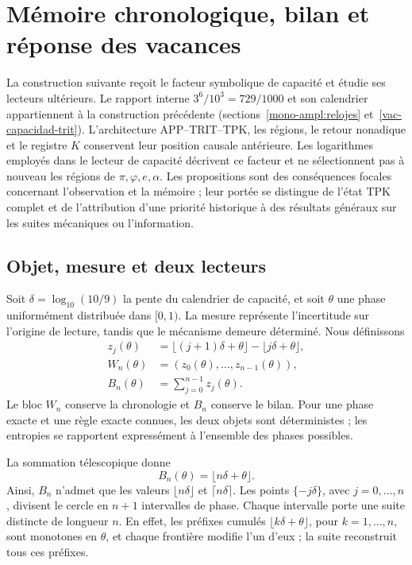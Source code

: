\section{Mémoire chronologique, bilan et réponse des vacances}
\label{md:cron:seccion}

La construction suivante reçoit le facteur symbolique de capacité et étudie ses lecteurs ultérieurs. Le rapport interne $3^6/10^3=729/1000$ et son calendrier appartiennent à la construction précédente (sections~\ref{mono-ampl:relojes} et~\ref{vac-capacidad-trit}). L'architecture APP--TRIT--TPK, les régions, le retour nonadique et le registre $K$ conservent leur position causale antérieure. Les logarithmes employés dans le lecteur de capacité décrivent ce facteur et ne sélectionnent pas à nouveau les régions de $\pi,\varphi,e,\alpha$. Les propositions sont des conséquences focales concernant l'observation et la mémoire ; leur portée se distingue de l'état TPK complet et de l'attribution d'une priorité historique à des résultats généraux sur les suites mécaniques ou l'information.

\subsection{Objet, mesure et deux lecteurs}
\label{md:cron:lectores}

Soit $\delta=\log_{10}(10/9)$ la pente du calendrier de capacité, et soit $\theta$ une phase uniformément distribuée dans $[0,1)$. La mesure représente l'incertitude sur l'origine de lecture, tandis que le mécanisme demeure déterminé. Nous définissons
\begin{equation}
 \begin{aligned}
 z_j(\theta)&=\lfloor(j+1)\delta+\theta\rfloor
             -\lfloor j\delta+\theta\rfloor,\\
 W_n(\theta)&=(z_0(\theta),\ldots,z_{n-1}(\theta)),\\
 B_n(\theta)&=\sum_{j=0}^{n-1}z_j(\theta).
 \end{aligned}
 \label{md:cron:dos-lectores}
\end{equation}
Le bloc $W_n$ conserve la chronologie et $B_n$ conserve le bilan. Pour une phase exacte et une règle exacte connues, les deux objets sont déterministes ; les entropies se rapportent expressément à l'ensemble des phases possibles.

La sommation télescopique donne
\begin{equation}
 B_n(\theta)=\lfloor n\delta+\theta\rfloor.
 \label{md:cron:telescopia}
\end{equation}
Ainsi, $B_n$ n'admet que les valeurs $\lfloor n\delta\rfloor$ et $\lceil n\delta\rceil$. Les points $\{-j\delta\}$, avec $j=0,\ldots,n$, divisent le cercle en $n+1$ intervalles de phase. Chaque intervalle porte une suite distincte de longueur $n$. En effet, les préfixes cumulés $\lfloor k\delta+\theta\rfloor$, pour $k=1,\ldots,n$, sont monotones en $\theta$, et chaque frontière modifie l'un d'eux ; la suite reconstruit tous ces préfixes.


